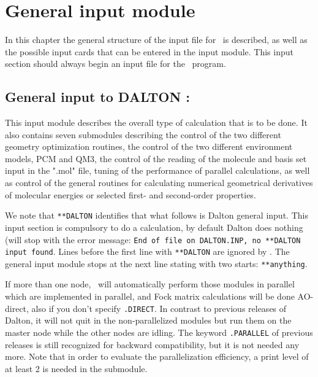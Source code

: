 \chapter{General input module}\label{ch:general}

In this chapter the general structure of the input file for \dalton\
is described, as well as the possible input cards that can be entered in
the \Sec{*DALTON} input module. This input section should always begin an
input file for the \dalton\ program.

\section{General input to DALTON : }\label{sec:general}

This input module describes the overall type of calculation that is to
be done. It also contains seven submodules describing
the control of the two different geometry optimization routines,
the control of the two different environment models, PCM and QM3,
the control of the reading of the molecule and basis set input
  in the ".mol" file,
tuning of the performance of parallel calculations,
as well as control of the general routines for calculating
numerical geometrical derivatives of molecular energies or selected
first- and second-order properties.

We note that \verb|**DALTON| identifies that what follows is Dalton general input.
This input section is compulsory to do a calculation, by default Dalton does nothing
(will stop with the error message:
{\tt End of file on DALTON.INP, no **DALTON input found}.
Lines before the first line with \verb|**DALTON| are ignored by \dalton .
The general input module stops at the next line stating with two starts: \verb|**anything|.

If more than one node, \dalton\ will automatically perform those modules in parallel
which are implemented in parallel, and Fock matrix calculations will be done AO-direct,
also if you don't specify \verb|.DIRECT|.
In contrast to previous releases of Dalton, it will not quit in the non-parallelized modules
but run them on the master node while the other nodes are idling.
The keyword \verb|.PARALLEL| of previous releases is still recognized for backward compatibility,
but it is not needed any more.
Note that in order to evaluate the parallelization efficiency,
a print level of at least 2 is needed in the \Sec{PARALLEL} submodule.

